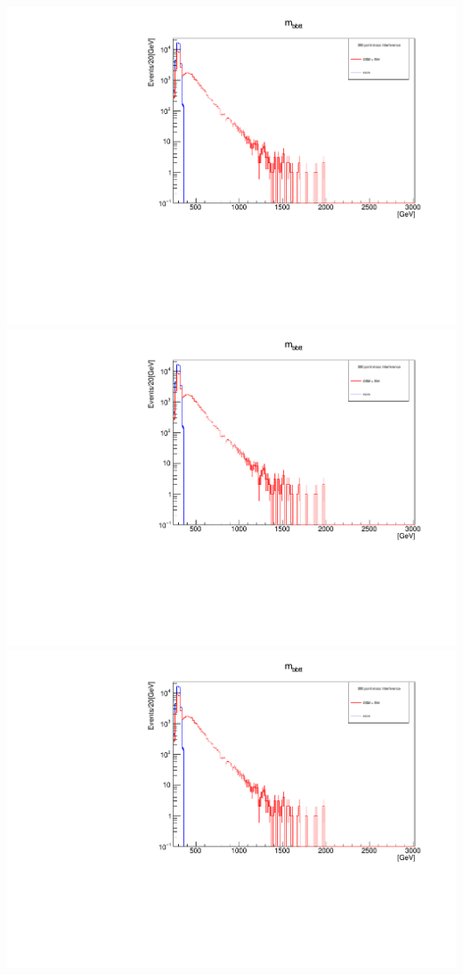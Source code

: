 \documentclass[a4wide,10pt]{article}
\begin{document}
\includegraphics[scale=0.50,page=4]{InterferencePlots.pdf}
\includegraphics[scale=0.50,page=5]{InterferencePlots.pdf}
\includegraphics[scale=0.50,page=6]{InterferencePlots.pdf}
\end{document}

